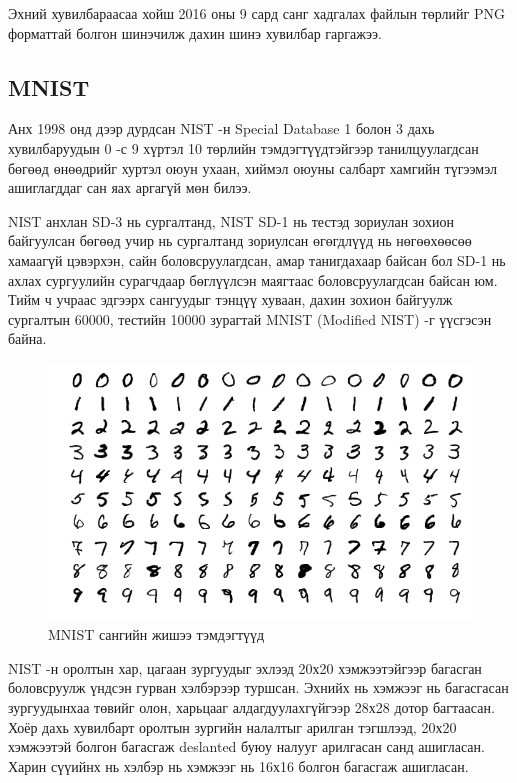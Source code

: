 Эхний хувилбараасаа хойш 2016 оны 9 сард санг хадгалах файлын төрлийг PNG форматтай болгон шинэчилж дахин шинэ хувилбар гаргажээ.

\subsection{MNIST \cite{mnist}}

Анх 1998 онд дээр дурдсан NIST -н Special Database 1 болон 3 дахь хувилбаруудын 0 -с 9 хүртэл 10 төрлийн тэмдэгтүүдтэйгээр танилцуулагдсан бөгөөд өнөөдрийг хуртэл оюун ухаан, хиймэл оюуны салбарт хамгийн түгээмэл ашиглагддаг сан яах аргагүй мөн билээ.

NIST анхлан SD-3 нь сургалтанд, NIST SD-1 нь тестэд зориулан зохион байгуулсан бөгөөд учир нь сургалтанд зориулсан өгөгдлүүд нь нөгөөхөөсөө хамаагүй цэвэрхэн, сайн боловсруулагдсан, амар танигдахаар байсан бол SD-1 нь ахлах сургуулийн сурагчдаар бөглүүлсэн маягтаас боловсруулагдсан байсан юм. Тийм ч учраас эдгээрх сангуудыг тэнцүү хуваан, дахин зохион байгуулж сургалтын 60000, тестийн 10000 зурагтай MNIST (Modified NIST) -г үүсгэсэн байна.\cite{mnist-paper}

\begin{figure}[h]
	\centering
	\includegraphics[scale=0.7]{"images/mnist.png"}
	\caption{MNIST сангийн жишээ тэмдэгтүүд \cite{mnist}}
	\label{fig:mnist-sample}
\end{figure}

NIST -н оролтын хар, цагаан зургуудыг эхлээд 20х20 хэмжээтэйгээр багасган боловсруулж үндсэн гурван хэлбэрээр туршсан. Эхнийх нь хэмжээг нь багасгасан зургуудынхаа төвийг олон, харьцааг алдагдуулахгүйгээр 28х28 дотор багтаасан. Хоёр дахь хувилбарт оролтын зургийн налалтыг арилган тэгшлээд, 20х20 хэмжээтэй болгон багасгаж deslanted буюу налууг арилгасан санд ашигласан. Харин сүүийнх нь хэлбэр нь хэмжээг нь 16х16 болгон багасгаж ашигласан.

